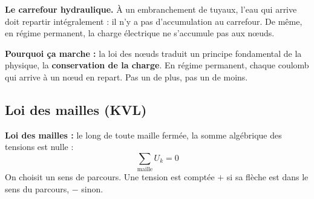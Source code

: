 \documentclass[12pt,a4paper,twoside]{book}
\begin{document}
\begin{center}
\end{center}

\begin{analogie}
\textbf{Le carrefour hydraulique.} À un embranchement de tuyaux, l'eau qui arrive doit repartir intégralement : il n'y a pas d'accumulation au carrefour. De même, en régime permanent, la charge électrique ne s'accumule pas aux n\oe uds.
\end{analogie}

\begin{intuition}
\textbf{Pourquoi ça marche :} la loi des n\oe uds traduit un principe fondamental de la physique, la \textbf{conservation de la charge}. En régime permanent, chaque coulomb qui arrive à un n\oe ud en repart. Pas un de plus, pas un de moins.
\end{intuition}

\subsection{Loi des mailles (KVL)}

\begin{formule}
\textbf{Loi des mailles :} le long de toute maille fermée, la somme algébrique des tensions est nulle :
\[
\boxed{\sum_{\text{maille}} U_k = 0}
\]
On choisit un sens de parcours. Une tension est comptée $+$ si sa flèche est dans le sens du parcours, $-$ sinon.
\end{formule}
\end{document}
